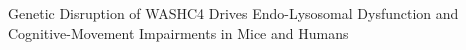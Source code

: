 Genetic Disruption of WASHC4 Drives Endo-Lysosomal Dysfunction and
Cognitive-Movement Impairments in Mice and Humans
